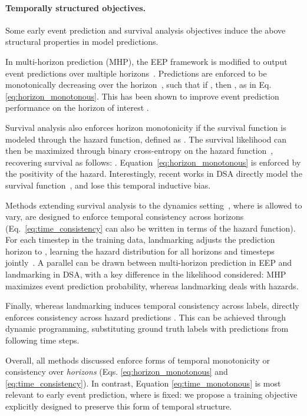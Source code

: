 \documentclass[nohyperref]{article}
\begin{document}
\paragraph{Temporally structured objectives.} Some early event prediction and survival analysis objectives induce the above structural properties in model predictions.


In multi-horizon prediction (MHP), the EEP framework is modified to output event predictions over multiple horizons~\cite{tomavsev2019,tomavsev2021,roy2021multitask}. Predictions are enforced to be monotonically decreasing over the horizon~\citep{tomavsev2019}, such that if , then , as in Eq. \ref{eq:horizon_monotonous}. This has been shown to improve event prediction performance on the horizon of interest . 


Survival analysis also enforces horizon monotonicity if the survival function is modeled through the hazard function, defined as .
The survival likelihood can then be maximized through binary cross-entropy on the hazard function~\cite{kalbfleisch2011statistical,craig2021survival}, recovering survival as follows: . Equation~\ref{eq:horizon_monotonous} is enforced by the positivity of the hazard. Interestingly, recent works in DSA directly model the survival function~\cite{lee2019dynamic,jarrett2019dynamic}, and lose this temporal inductive bias.


Methods extending survival analysis to the dynamics setting~\cite{van2007dynamic}, where  is allowed to vary, are designed to enforce temporal consistency across horizons (Eq.~\ref{eq:time_consistency} can also be written in terms of the hazard function). 
For each timestep  in the training data, landmarking adjusts the prediction horizon to , learning the hazard distribution for all horizons and timesteps jointly~\cite{van2007dynamic, parast2014landmark}. A parallel can be drawn between multi-horizon prediction in EEP and landmarking in DSA, with a key difference in the likelihood considered: MHP maximizes event prediction probability, whereas landmarking deals with hazards.


Finally, whereas landmarking induces temporal consistency across labels, \citet{Maystre2022} directly enforces consistency across hazard predictions . This can be achieved through dynamic programming, substituting ground truth labels with predictions from following time steps.






Overall, all methods discussed enforce forms of temporal monotonicity or consistency over \textit{horizons} (Eqs. \ref{eq:horizon_monotonous} and  \ref{eq:time_consistency}). In contrast, Equation \ref{eq:time_monotonous} is most relevant to early event prediction, where  is fixed: we propose a training objective explicitly designed to preserve this form of temporal structure.
\end{document}
